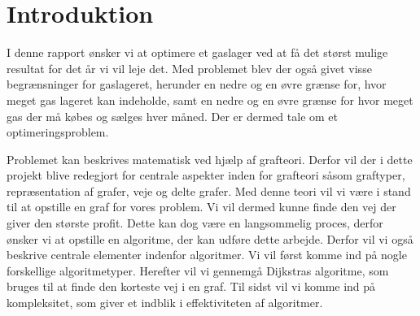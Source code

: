 \section{Introduktion}
I denne rapport ønsker vi at optimere et gaslager ved at få det størst mulige resultat for det år vi vil leje det. Med problemet blev der også givet visse begrænsninger for gaslageret, herunder en nedre og en øvre grænse for, hvor meget gas lageret kan indeholde, samt en nedre og en øvre grænse for hvor meget gas der må købes og sælges hver måned. Der er dermed tale om et optimeringsproblem. 

Problemet kan beskrives matematisk ved hjælp af grafteori. Derfor vil der i dette projekt blive redegjort for centrale aspekter inden for grafteori såsom graftyper, repræsentation af grafer, veje og delte grafer. Med denne teori vil vi være i stand til at opstille en graf for vores problem. Vi vil dermed kunne finde den vej der giver den største profit. 
Dette kan dog være en langsommelig proces, derfor ønsker vi at opstille en algoritme, der kan udføre dette arbejde. Derfor vil vi også beskrive centrale elementer indenfor algoritmer. Vi vil først komme ind på nogle forskellige algoritmetyper. Herefter vil vi gennemgå Dijkstras algoritme, som bruges til at finde den korteste vej i en graf. Til sidst vil vi komme ind på kompleksitet, som giver et indblik i effektiviteten af algoritmer.




